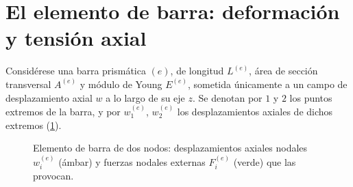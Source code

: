 \section{El elemento de barra: deformación y tensión axial}
\label{sec:cap04-repaso-barra}

Considérese una barra prismática $(e)$, de longitud $L^{(e)}$, área de sección transversal $A^{(e)}$ y módulo de Young $E^{(e)}$, sometida únicamente a un campo de desplazamiento axial $w$ a lo largo de su eje $z$. Se denotan por $1$ y $2$ los puntos extremos de la barra, y por $w_1^{(e)}$, $w_2^{(e)}$ los desplazamientos axiales de dichos extremos (\cref{fig:cap04-elemento-barra}).

\begin{figure}[htbp]
\centering
{}
\caption{Elemento de barra de dos nodos: desplazamientos axiales nodales $w_i^{(e)}$ (ámbar) y fuerzas nodales externas $F_i^{(e)}$ (verde) que las provocan.}
\label{fig:cap04-elemento-barra}
\end{figure}

